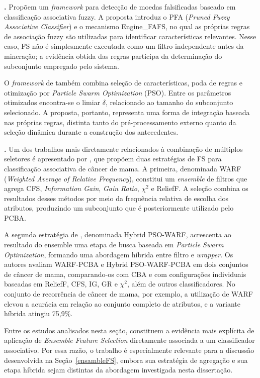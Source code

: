 \medskip

\noindent\textbf{.}
Propõem um \textit{framework} para detecção de
moedas falsificadas baseado em classificação associativa fuzzy. A proposta
introduz o PFA (\textit{Pruned Fuzzy Associative Classifier}) e o mecanismo
Engine\_FAFS, no qual as próprias regras de associação fuzzy são utilizadas para
identificar características relevantes. Nesse caso, FS não é simplesmente
executada como um filtro independente antes da mineração; a evidência obtida das
regras participa da determinação do subconjunto empregado pelo sistema.

O \textit{framework} de  também combina seleção de
características, poda de regras e otimização por \textit{Particle Swarm
Optimization} (PSO). Entre os parâmetros otimizados encontra-se o limiar
$\delta$, relacionado ao tamanho do subconjunto selecionado. A proposta,
portanto, representa uma forma de integração baseada nas próprias regras,
distinta tanto do pré-processamento externo quanto da seleção dinâmica durante a
construção dos antecedentes.

\medskip

\noindent\textbf{.}
Um dos trabalhos mais diretamente relacionados à combinação de múltiplos
seletores é apresentado por , que propõem duas
estratégias de FS para classificação associativa de câncer de mama. A primeira,
denominada WARF (\textit{Weighted Average of Relative Frequency}), constitui um
\textit{ensemble} de filtros que agrega CFS, \textit{Information Gain},
\textit{Gain Ratio}, $\chi^2$ e ReliefF. A seleção combina os resultados desses
métodos por meio da frequência relativa de escolha dos atributos, produzindo um
subconjunto que é posteriormente utilizado pelo PCBA.

A segunda estratégia de , denominada Hybrid
PSO-WARF, acrescenta ao resultado do ensemble uma etapa de busca baseada em
\textit{Particle Swarm Optimization}, formando uma abordagem híbrida entre
filtro e \textit{wrapper}. Os autores avaliam WARF-PCBA e Hybrid
PSO-WARF-PCBA em dois conjuntos de câncer de mama, comparando-os com CBA e com
configurações individuais baseadas em ReliefF, CFS, IG, GR e $\chi^2$, além de
outros classificadores. No conjunto de recorrência de câncer de mama, por
exemplo, a utilização de WARF elevou a acurácia em relação ao conjunto completo
de atributos, e a variante híbrida atingiu 75,9\%.

Entre os estudos analisados nesta seção, 
constituem a evidência mais explícita de aplicação de
\textit{Ensemble Feature Selection} diretamente associada a um classificador
associativo. Por essa razão, o trabalho é especialmente relevante para a
discussão desenvolvida na Seção~\ref{ensambleFS}, embora sua estratégia de
agregação e sua etapa híbrida sejam distintas da abordagem investigada nesta
dissertação.

